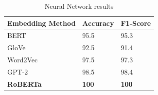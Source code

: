 \begin{table}[hbt!]
\begin{threeparttable}
\caption{Neural Network results}
\label{nn_results}
\begin{tabular}{lll}
\toprule
\headrow Embedding Method & Accuracy & F1-Score\\
\midrule
 BERT     &       95.5 &       95.3 \\
 GloVe    &       92.5 &       91.4 \\
 Word2Vec &       97.5 &       97.3 \\
 GPT-2    &       98.5 &       98.4 \\
 \textbf{RoBERTa}  &        \textbf{100} &        \textbf{100} \\
\bottomrule
\end{tabular}
\end{threeparttable}
\end{table}